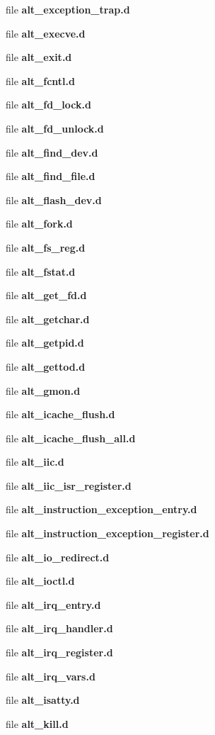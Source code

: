 \begin{DoxyCompactItemize}
file {\bf alt\+\_\+exception\+\_\+trap.\+d}
\item 
file {\bf alt\+\_\+execve.\+d}
\item 
file {\bf alt\+\_\+exit.\+d}
\item 
file {\bf alt\+\_\+fcntl.\+d}
\item 
file {\bf alt\+\_\+fd\+\_\+lock.\+d}
\item 
file {\bf alt\+\_\+fd\+\_\+unlock.\+d}
\item 
file {\bf alt\+\_\+find\+\_\+dev.\+d}
\item 
file {\bf alt\+\_\+find\+\_\+file.\+d}
\item 
file {\bf alt\+\_\+flash\+\_\+dev.\+d}
\item 
file {\bf alt\+\_\+fork.\+d}
\item 
file {\bf alt\+\_\+fs\+\_\+reg.\+d}
\item 
file {\bf alt\+\_\+fstat.\+d}
\item 
file {\bf alt\+\_\+get\+\_\+fd.\+d}
\item 
file {\bf alt\+\_\+getchar.\+d}
\item 
file {\bf alt\+\_\+getpid.\+d}
\item 
file {\bf alt\+\_\+gettod.\+d}
\item 
file {\bf alt\+\_\+gmon.\+d}
\item 
file {\bf alt\+\_\+icache\+\_\+flush.\+d}
\item 
file {\bf alt\+\_\+icache\+\_\+flush\+\_\+all.\+d}
\item 
file {\bf alt\+\_\+iic.\+d}
\item 
file {\bf alt\+\_\+iic\+\_\+isr\+\_\+register.\+d}
\item 
file {\bf alt\+\_\+instruction\+\_\+exception\+\_\+entry.\+d}
\item 
file {\bf alt\+\_\+instruction\+\_\+exception\+\_\+register.\+d}
\item 
file {\bf alt\+\_\+io\+\_\+redirect.\+d}
\item 
file {\bf alt\+\_\+ioctl.\+d}
\item 
file {\bf alt\+\_\+irq\+\_\+entry.\+d}
\item 
file {\bf alt\+\_\+irq\+\_\+handler.\+d}
\item 
file {\bf alt\+\_\+irq\+\_\+register.\+d}
\item 
file {\bf alt\+\_\+irq\+\_\+vars.\+d}
\item 
file {\bf alt\+\_\+isatty.\+d}
\item 
file {\bf alt\+\_\+kill.\+d}
\item 

\end{DoxyCompactItemize}

